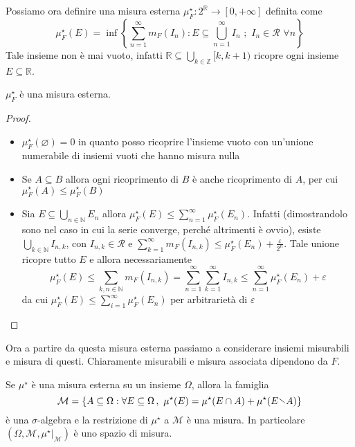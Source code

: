 Possiamo ora definire una misura esterna \(\mu^\star_F : 2^{\mathbb{R}} \to [0,
+\infty]\) definita come
\[
    \mu^\star_F{(E)} = \inf \left\{ \sum_{n=1}^{\infty} m_F{(I_{n})} : E
    \subseteq \bigcup_{n=1}^{\infty} I_{n} \,\,;\,\, I_{n} \in \mathcal{R}
\,\,\forall n \right\} 
\]
Tale insieme non è mai vuoto, infatti \(\mathbb{R} \subseteq \bigcup_{k \in
\mathbb{Z}} [k, k+1) \) ricopre ogni insieme \(E \subseteq \mathbb{R} \).
\begin{proposition}
    \(\mu^\star_F\) è una misura esterna.
\end{proposition}
\begin{proof}
\begin{itemize}[label = --]
    \item \(\mu^\star_F{(\varnothing)} = 0\) in quanto posso ricoprire l'insieme
        vuoto con un'unione numerabile di insiemi vuoti che hanno misura nulla
    \item  Se \(A \subseteq B \) allora ogni ricoprimento di \(B\) è anche
        ricoprimento di \(A\), per cui \(\mu^\star_F{(A)} \le \mu^\star_F{(B)}\)
    \item Sia \(E \subseteq \bigcup_{n \in \mathbb{N}} E_{n} \) allora
        \(\mu^\star_F{(E)} \le \sum_{n=1}^{\infty} \mu^\star_F{(E_{n})} \).
        Infatti (dimostrandolo sono nel caso in cui la serie converge, perché
        altrimenti è ovvio), esiste \(\bigcup_{k \in \mathbb{N}} I_{n, k} \),
        con \(I_{n, k}  \in \mathcal{R}\) e \(\sum_{k=1}^{\infty} m_F{(I_{n, k}
        )} \le \mu^\star_F{(E_{n})} + \frac{\varepsilon}{2^{n}}\). Tale unione
        ricopre tutto \(E\) e allora necessariamente
        \[
            \mu^\star_F{(E)} \le \sum_{k, n \in \mathbb{N}} m_F{(I_{n, k})} =
            \sum_{n=1}^{\infty} \sum_{k=1}^{\infty} I_{n, k} \le
            \sum_{n=1}^{\infty}  \mu^\star_F{(E_{n})} + \varepsilon
        \]
        da cui \(\mu^\star_F{(E)} \le \sum_{i=1}^{\infty} \mu^\star_F{(E_n)} \)
        per arbitrarietà di \(\varepsilon\) 
\end{itemize}
\end{proof}
Ora a partire da questa misura esterna passiamo a considerare insiemi misurabili
e misura di questi. Chiaramente misurabili e misura associata dipendono da
\(F\). 
\begin{theorem}
    Se \(\mu^\star\) è una misura esterna su un insieme \(\Omega\), allora la
    famiglia 
    \[
      \mathcal{M} = \left\{ A \subseteq \Omega : \forall E \subseteq
          \Omega\,,\,\, \mu^\star{(E)} = \mu^\star{(E \cap A)} + \mu^\star{(E
      \sminus A)} \right\}
    \]
    è una \(\sigma\)-algebra e la restrizione di \(\mu^\star\) a \(\mathcal{M}\)
    è una misura. In particolare \((\Omega, \mathcal{M},
    \mu^\star|_{\mathcal{M}} )\) è uno spazio di misura.
\end{theorem}
